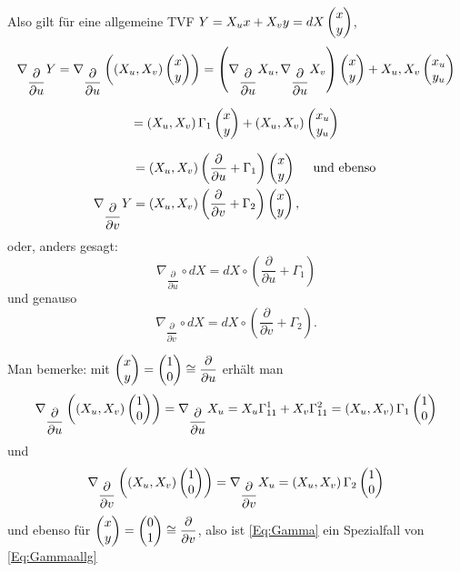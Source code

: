 	Also gilt für eine allgemeine TVF $ Y=X_ux+X_vy=dX\begin{pmatrix} x \\ y \end{pmatrix} $, 
		\[ \nabla_{\dfrac{\partial}{\partial u}}Y= \nabla_{\dfrac{\partial}{\partial u}}\left ( \left( X_u,X_v \right) \begin{pmatrix} x \\y \end{pmatrix}    \right ) = \left( \nabla_{\dfrac{\partial}{\partial u}}X_u,\nabla_{\dfrac{\partial}{\partial u}}X_v \right) \begin{pmatrix} x \\y \end{pmatrix} + X_u,X_v \begin{pmatrix} x_u \\ y_u \end{pmatrix} \]

		\[ = \left( X_u, X_v \right) \Gamma_1\begin{pmatrix} x \\ y \end{pmatrix} + \left( X_u, X_v \right) \begin{pmatrix} x_u \\ y_u \end{pmatrix} \] 
		
		\begin{equation} \label{Eq:Gammaallg}
		\begin{split}
			&= \left( X_u, X_v \right) \left( \dfrac{\partial}{\partial u} +\Gamma_1 \right) \begin{pmatrix} x \\ y \end{pmatrix}  \quad \text{ und ebenso }
		 \\ 
		 \nabla_{\dfrac{\partial}{\partial v}}Y &= \left( X_u, X_v \right) \left( \dfrac{\partial}{\partial v} +\Gamma_2 \right) \begin{pmatrix} x \\ y \end{pmatrix}, 
		 \end{split}
		\end{equation} 
	oder, anders gesagt:
		\[ \nabla_{\dfrac{\partial}{\partial u}} \circ dX = dX \circ \left( \dfrac{\partial}{\partial u} + \Gamma_1 \right)  \]
	und genauso
		\[  \nabla_{\dfrac{\partial}{\partial v}} \circ dX = dX \circ \left( \dfrac{\partial}{\partial v} + \Gamma_2 \right).   \]	
	
	Man bemerke: mit $ \begin{pmatrix} x \\ y \end{pmatrix} = \begin{pmatrix} 1 \\ 0 \end{pmatrix} \cong \dfrac{\partial}{\partial u} $ erhält man
		\[ \nabla_{\dfrac{\partial}{\partial u}}\left( \left( X_u,X_v \right) \begin{pmatrix} 1 \\ 0 \end{pmatrix} \right) = \nabla_{\dfrac{\partial}{\partial u}}X_u = X_u \Gamma_{11}^1 + X_v\Gamma_{11}^2 = \left( X_u,X_v \right) \Gamma_1\begin{pmatrix} 1 \\ 0 \end{pmatrix}   \] 
	und
		\[ \nabla_{\dfrac{\partial}{\partial v}} \left( \left( X_u,X_v \right) \begin{pmatrix} 1 \\ 0 \end{pmatrix} \right) = \nabla_{\dfrac{\partial}{\partial v}}X_u = \left( X_u,X_v \right) \Gamma_2\begin{pmatrix} 1 \\ 0 \end{pmatrix} \]
	und ebenso für  $ \begin{pmatrix} x \\ y \end{pmatrix} = \begin{pmatrix} 0 \\ 1 \end{pmatrix} \cong \dfrac{\partial}{\partial v} $, also ist \ref*{Eq:Gamma} ein Spezialfall von \ref*{Eq:Gammaallg}
	
